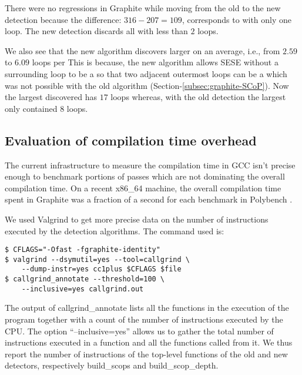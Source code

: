 \documentclass{sig-alternate}
\begin{document}
There were no regressions in Graphite while moving from the old to the new \SCoP{}
detection because the difference: $316 - 207 = 109$, corresponds
to  with only one loop.  The new \SCoP{}
detection discards all  with less than $2$ loops.

We also see that the new algorithm discovers larger  on an average,
i.e., from $2.59$ to $6.09$ loops per  This is because, the new
algorithm allows SESE without a surrounding loop to be a \SCoP{} so that two
adjacent outermost loops can be a \SCoP{,} which was not possible with the old algorithm
(Section-\ref{subsec:graphite-SCoP}). Now the largest \SCoP{} discovered has $17$
loops whereas, with the old \SCoP{} detection the largest \SCoP{} only contained $8$ loops.

\subsection{Evaluation of compilation time overhead}
The current infrastructure to measure the compilation time in GCC isn't precise
enough to benchmark portions of passes which are not dominating the overall
compilation time.  On a recent x86\_64 machine, the overall compilation time
spent in Graphite was a fraction of a second for each benchmark
in Polybench \cite{polybench}.

We used Valgrind to get more precise data on the number of instructions executed
by the \SCoP{} detection algorithms.  The command used is:
\begin{verbatim}
$ CFLAGS="-Ofast -fgraphite-identity"
$ valgrind --dsymutil=yes --tool=callgrind \
    --dump-instr=yes cc1plus $CFLAGS $file
$ callgrind_annotate --threshold=100 \
    --inclusive=yes callgrind.out
\end{verbatim}

The output of callgrind\_annotate lists all the functions in the execution of
the program together with a count of the number of instructions executed by the
CPU.  The option ``--inclusive=yes'' allows us to gather the total number of
instructions executed in a function and all the functions called from it.  We
thus report the number of instructions of the top-level functions of the old and
new \SCoP{} detectors, respectively build\_scops and build\_scop\_depth.
\end{document}
